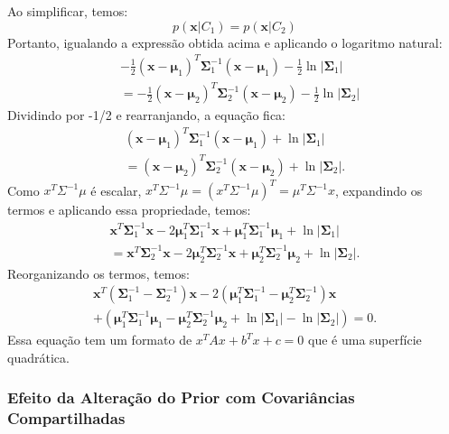 \documentclass[conference]{IEEEtran}
\begin{document}
Ao simplificar, temos:
\[
p(\mathbf{x} | C_1) = p(\mathbf{x} | C_2)
\]
Portanto, igualando a expressão obtida acima e aplicando o logaritmo natural:
\begin{align*}
& -\frac{1}{2} (\mathbf{x} - \boldsymbol{\mu}_1)^T \boldsymbol{\Sigma}_1^{-1} (\mathbf{x} - \boldsymbol{\mu}_1) - \frac{1}{2} \ln |\boldsymbol{\Sigma}_1| \\
&= -\frac{1}{2} (\mathbf{x} - \boldsymbol{\mu}_2)^T \boldsymbol{\Sigma}_2^{-1} (\mathbf{x} - \boldsymbol{\mu}_2) - \frac{1}{2} \ln |\boldsymbol{\Sigma}_2|
\end{align*}
Dividindo por -1/2 e rearranjando, a equação fica:
\begin{multline*}
(\mathbf{x} - \boldsymbol{\mu}_1)^T \boldsymbol{\Sigma}_1^{-1} (\mathbf{x} - \boldsymbol{\mu}_1) + \ln |\boldsymbol{\Sigma}_1| \\
= (\mathbf{x} - \boldsymbol{\mu}_2)^T \boldsymbol{\Sigma}_2^{-1} (\mathbf{x} - \boldsymbol{\mu}_2) + \ln |\boldsymbol{\Sigma}_2|.
\end{multline*}
Como $x^T\Sigma^{-1}\mu$ é escalar, $x^T\Sigma^{-1}\mu = (x^T\Sigma^{-1}\mu)^T = \mu ^ T \Sigma ^{-1} x$, expandindo os termos e aplicando essa propriedade, temos: 
\begin{multline*}
\mathbf{x}^T \boldsymbol{\Sigma}_1^{-1} \mathbf{x} - 2 \boldsymbol{\mu}_1^T \boldsymbol{\Sigma}_1^{-1} \mathbf{x} + \boldsymbol{\mu}_1^T \boldsymbol{\Sigma}_1^{-1} \boldsymbol{\mu}_1 + \ln |\boldsymbol{\Sigma}_1| \\
= \mathbf{x}^T \boldsymbol{\Sigma}_2^{-1} \mathbf{x} - 2 \boldsymbol{\mu}_2^T \boldsymbol{\Sigma}_2^{-1} \mathbf{x} + \boldsymbol{\mu}_2^T \boldsymbol{\Sigma}_2^{-1} \boldsymbol{\mu}_2 + \ln |\boldsymbol{\Sigma}_2|.
\end{multline*}
Reorganizando os termos, temos:
\begin{multline*}
\mathbf{x}^T (\boldsymbol{\Sigma}_1^{-1} - \boldsymbol{\Sigma}_2^{-1}) \mathbf{x} - 2 (\boldsymbol{\mu}_1^T \boldsymbol{\Sigma}_1^{-1} - \boldsymbol{\mu}_2^T \boldsymbol{\Sigma}_2^{-1}) \mathbf{x} \\
+ \left(\boldsymbol{\mu}_1^T \boldsymbol{\Sigma}_1^{-1} \boldsymbol{\mu}_1 - \boldsymbol{\mu}_2^T \boldsymbol{\Sigma}_2^{-1} \boldsymbol{\mu}_2 + \ln |\boldsymbol{\Sigma}_1| - \ln |\boldsymbol{\Sigma}_2|\right) = 0.
\end{multline*}
Essa equação tem um formato de $x^TAx + b^Tx+c = 0$ que é uma superfície quadrática.\\

\subsubsection{Efeito da Alteração do Prior com Covariâncias Compartilhadas}
\end{document}
